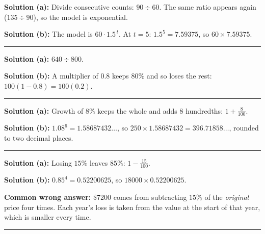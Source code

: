 \documentclass[12pt]{article}
\begin{document}



\textbf{Solution (a):} Divide consecutive counts: $90 \div 60$. The same ratio appears again ($135 \div 90$), so the model is exponential. 

\textbf{Solution (b):} The model is $60 \cdot 1.5^{\,t}$. At $t = 5$: $1.5^5 = 7.59375$, so $60 \times 7.59375$. 

\vspace{0.2cm}\noindent\rule{\linewidth}{0.2pt}


\textbf{Solution (a):} $640 \div 800$. 

\textbf{Solution (b):} A multiplier of $0.8$ keeps $80\%$ and so loses the rest: $100(1 - 0.8) = 100(0.2)$. 

\vspace{0.2cm}\noindent\rule{\linewidth}{0.2pt}


\textbf{Solution (a):} Growth of $8\%$ keeps the whole and adds $8$ hundredths: $1 + \frac{8}{100}$. 

\textbf{Solution (b):} $1.08^6 = 1.58687432\ldots$, so $250 \times 1.58687432 = 396.71858\ldots$, rounded to two decimal places. 

\vspace{0.2cm}\noindent\rule{\linewidth}{0.2pt}


\textbf{Solution (a):} Losing $15\%$ leaves $85\%$: $1 - \frac{15}{100}$. 

\textbf{Solution (b):} $0.85^4 = 0.52200625$, so $18000 \times 0.52200625$. 

\textbf{Common wrong answer:} \$7200 comes from subtracting $15\%$ of the \emph{original} price four times. Each year's loss is taken from the value at the start of that year, which is smaller every time.

\vspace{0.2cm}\noindent\rule{\linewidth}{0.2pt}
\end{document}
